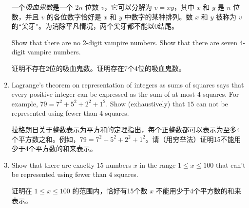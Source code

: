 \begin{enumerate}
  一个\emph{吸血鬼数}是一个 $2n$ 位数 $v$，它可以分解为 $v=xy$，其中 $x$ 和 $y$ 是 $n$ 位数，并且 $v$ 的各位数字恰好是 $x$ 和 $y$ 中数字的某种排列。数 $x$ 和 $y$ 被称为 $v$ 的“尖牙”。为消除平凡情况，两个尖牙都不能以0结尾。
  
  Show that there are no 2-digit vampire numbers.
  Show that there are seven 4-digit vampire numbers.
  
  证明不存在2位的吸血鬼数。证明存在7个4位的吸血鬼数。
  
  
  \wbvfill
  
  \workbookpagebreak
  
  \item Lagrange's theorem on representation of integers as sums of squares
  says that every positive integer can be expressed as the sum of at most 
  $4$ squares.
  For example, $79 = 7^2 + 5^2 + 2^2 + 1^2$.
  Show (exhaustively) 
  that $15$ can not be represented using fewer than $4$ squares.
  
  拉格朗日关于整数表示为平方和的定理指出，每个正整数都可以表示为至多4个平方数之和。例如，$79 = 7^2 + 5^2 + 2^2 + 1^2$。请（用穷举法）证明15不能用少于4个平方数的和来表示。
  
  \wbvfill
  
  \item Show that there are exactly $15$ numbers $x$ in the range $1 \leq x \leq 100$ that can't be represented using fewer than $4$ squares.
  
  证明在 $1 \leq x \leq 100$ 的范围内，恰好有15个数 $x$ 不能用少于4个平方数的和来表示。
\end{enumerate}
